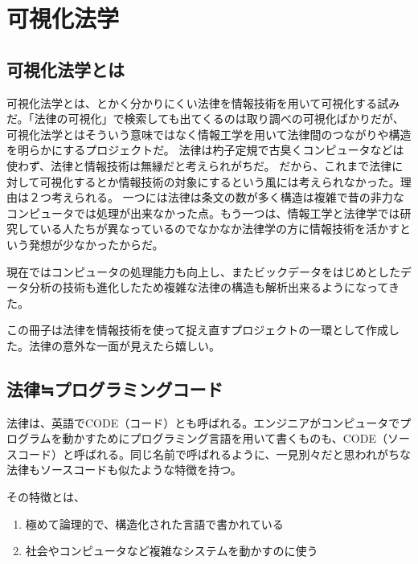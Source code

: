 \documentclass[a5j,openany,twoside]{jsbook}
\begin{document}
%
%
%
\chapter{可視化法学}

\setcounter{page}{1}

\section{可視化法学とは}

可視化法学とは、とかく分かりにくい法律を情報技術を用いて可視化する試みだ。「法律の可視化」で検索しても出てくるのは取り調べの可視化ばかりだが、可視化法学とはそういう意味ではなく情報工学を用いて法律間のつながりや構造を明らかにするプロジェクトだ。
法律は杓子定規で古臭くコンピュータなどは使わず、法律と情報技術は無縁だと考えられがちだ。
だから、これまで法律に対して可視化するとか情報技術の対象にするという風には考えられなかった。理由は２つ考えられる。
一つには法律は条文の数が多く構造は複雑で昔の非力なコンピュータでは処理が出来なかった点。もう一つは、情報工学と法律学では研究している人たちが異なっているのでなかなか法律学の方に情報技術を活かすという発想が少なかったからだ。

現在ではコンピュータの処理能力も向上し、またビックデータをはじめとしたデータ分析の技術も進化したため複雑な法律の構造も解析出来るようになってきた。

この冊子は法律を情報技術を使って捉え直すプロジェクトの一環として作成した。法律の意外な一面が見えたら嬉しい。

\section{法律≒プログラミングコード}

法律は、英語でCODE（コード）とも呼ばれる。エンジニアがコンピュータでプログラムを動かすためにプログラミング言語を用いて書くものも、CODE（ソースコード）と呼ばれる。同じ名前で呼ばれるように、一見別々だと思われがちな法律もソースコードも似たような特徴を持つ。

その特徴とは、

\begin{enumerate}
 \item 極めて論理的で、構造化された言語で書かれている
 \item 社会やコンピュータなど複雑なシステムを動かすのに使う
\end{enumerate}
\end{document}
